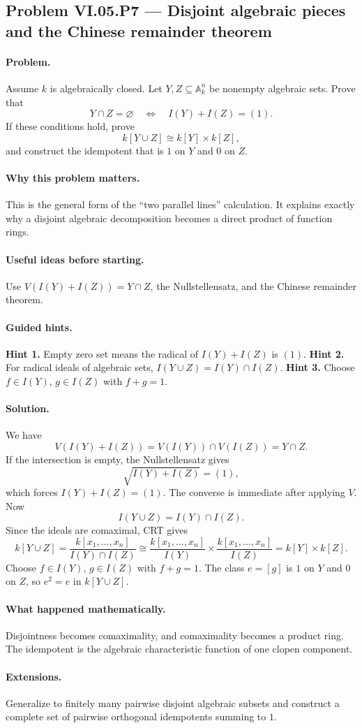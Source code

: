 \subsection*{Problem VI.05.P7 --- Disjoint algebraic pieces and the Chinese remainder theorem}
\label{prob:vi05-p7}
\paragraph{Problem.}
Assume \(k\) is algebraically closed.  Let \(Y,Z\subseteq\mathbb A_k^n\) be nonempty
algebraic sets.  Prove that
\[
Y\cap Z=\varnothing
\quad\Longleftrightarrow\quad
I(Y)+I(Z)=(1).
\]
If these conditions hold, prove
\[
k[Y\cup Z]\cong k[Y]\times k[Z],
\]
and construct the idempotent that is \(1\) on \(Y\) and \(0\) on \(Z\).
\ifdefined\FullProblemDossiers
\paragraph{Why this problem matters.}
This is the general form of the ``two parallel lines'' calculation.  It explains exactly
why a disjoint algebraic decomposition becomes a direct product of function rings.
\paragraph{Useful ideas before starting.}
Use \(V(I(Y)+I(Z))=Y\cap Z\), the Nullstellensatz, and the Chinese remainder theorem.
\paragraph{Guided hints.}
\textbf{Hint 1.} Empty zero set means the radical of \(I(Y)+I(Z)\) is \((1)\).
\textbf{Hint 2.} For radical ideals of algebraic sets, \(I(Y\cup Z)=I(Y)\cap I(Z)\).
\textbf{Hint 3.} Choose \(f\in I(Y)\), \(g\in I(Z)\) with \(f+g=1\).
\paragraph{Solution.}
We have
\[
V(I(Y)+I(Z))=V(I(Y))\cap V(I(Z))=Y\cap Z.
\]
If the intersection is empty, the Nullstellensatz gives
\[
\sqrt{I(Y)+I(Z)}=(1),
\]
which forces \(I(Y)+I(Z)=(1)\).  The converse is immediate after applying \(V\).
Now
\[
I(Y\cup Z)=I(Y)\cap I(Z).
\]
Since the ideals are comaximal, CRT gives
\[
k[Y\cup Z]
=\frac{k[x_1,\dots,x_n]}{I(Y)\cap I(Z)}
\cong
\frac{k[x_1,\dots,x_n]}{I(Y)}\times
\frac{k[x_1,\dots,x_n]}{I(Z)}
=k[Y]\times k[Z].
\]
Choose \(f\in I(Y)\), \(g\in I(Z)\) with \(f+g=1\).  The class \(e=[g]\) is \(1\) on
\(Y\) and \(0\) on \(Z\), so \(e^2=e\) in \(k[Y\cup Z]\).
\paragraph{What happened mathematically.}
Disjointness becomes comaximality, and comaximality becomes a product ring.  The idempotent
is the algebraic characteristic function of one clopen component.
\paragraph{Extensions.}
Generalize to finitely many pairwise disjoint algebraic subsets and construct a complete
set of pairwise orthogonal idempotents summing to \(1\).
\fi
